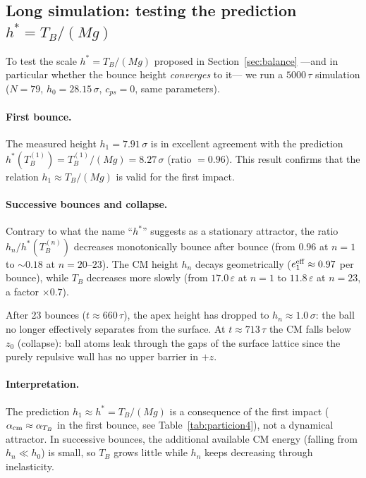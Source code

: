 \documentclass[aps,pre,twocolumn,reprint,superscriptaddress]{revtex4-2}
\newcommand{\eps}{\varepsilon}
\begin{document}
\subsection{Long simulation: testing the prediction \texorpdfstring{$h^*=T_B/(Mg)$}{h*}}
\label{sec:largo}

To test the scale $h^*=T_B/(Mg)$ proposed in Section~\ref{sec:balance}
---and in particular whether the bounce height \emph{converges} to it--- we
run a $5000\,\tau$ simulation ($N=79$, $h_0=28.15\,\sigma$, $c_{ps}=0$,
same parameters).

\paragraph{First bounce.}
The measured height $h_1=7.91\,\sigma$ is in excellent agreement with the
prediction $h^*(T_B^{(1)})=T_B^{(1)}/(Mg)=8.27\,\sigma$ (ratio $=0.96$).
This result confirms that the relation $h_1\approx T_B/(Mg)$ is valid for
the first impact.

\paragraph{Successive bounces and collapse.}
Contrary to what the name ``$h^*$'' suggests as a stationary attractor, the
ratio $h_n/h^*(T_B^{(n)})$ decreases monotonically bounce after bounce
(from 0.96 at $n=1$ to $\sim0.18$ at $n=20$--$23$). The CM height $h_n$
decays geometrically ($e_1^{\rm eff}\approx0.97$ per bounce), while $T_B$
decreases more slowly (from $17.0\,\eps$ at $n=1$ to $11.8\,\eps$ at
$n=23$, a factor $\times0.7$).

After 23 bounces ($t\approx660\,\tau$), the apex height has dropped to
$h_n\approx1.0\,\sigma$: the ball no longer effectively separates from the
surface. At $t\approx713\,\tau$ the CM falls below $z_0$ (collapse): ball
atoms leak through the gaps of the surface lattice since the purely
repulsive wall has no upper barrier in $+z$.

\paragraph{Interpretation.}
The prediction $h_1\approx h^*=T_B/(Mg)$ is a consequence of the first
impact ($\alpha_{\rm cm}\approx\alpha_{T_B}$ in the first bounce, see
Table~\ref{tab:particion4}), not a dynamical attractor. In successive
bounces, the additional available CM energy (falling from $h_n\ll h_0$) is
small, so $T_B$ grows little while $h_n$ keeps decreasing through
inelasticity.
\end{document}

